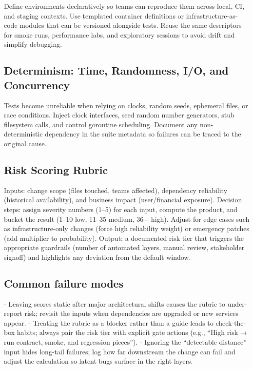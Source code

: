 Define environments declaratively so teams can reproduce them across local, CI, and staging contexts. Use templated container definitions or infrastructure-as-code modules that can be versioned alongside tests. Reuse the same descriptors for smoke runs, performance labs, and exploratory sessions to avoid drift and simplify debugging.

\subsection{Determinism: Time, Randomness, I/O, and Concurrency}

Tests become unreliable when relying on clocks, random seeds, ephemeral files, or race conditions. Inject clock interfaces, seed random number generators, stub filesystem calls, and control goroutine scheduling. Document any non-deterministic dependency in the suite metadata so failures can be traced to the original cause.

\subsection{Risk Scoring Rubric}
Inputs: change scope (files touched, teams affected), dependency reliability (historical availability), and business impact (user/financial exposure). Decision steps: assign severity numbers (1–5) for each input, compute the product, and bucket the result (1–10 low, 11–35 medium, 36+ high). Adjust for edge cases such as infrastructure-only changes (force high reliability weight) or emergency patches (add multiplier to probability). Output: a documented risk tier that triggers the appropriate guardrails (number of automated layers, manual review, stakeholder signoff) and highlights any deviation from the default window.

\subsection{Common failure modes}
- Leaving scores static after major architectural shifts causes the rubric to under-report risk; revisit the inputs when dependencies are upgraded or new services appear.
- Treating the rubric as a blocker rather than a guide leads to check-the-box habits; always pair the risk tier with explicit gate actions (e.g., ``High risk → run contract, smoke, and regression pieces'').
- Ignoring the “detectable distance” input hides long-tail failures; log how far downstream the change can fail and adjust the calculation so latent bugs surface in the right layers.
 
